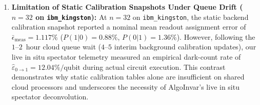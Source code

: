 \documentclass[aps,pra,reprint,superscriptaddress,floatfix,nofootinbib]{revtex4-2}
\begin{document}
\begin{enumerate}
    \item \textbf{Limitation of Static Calibration Snapshots Under Queue Drift ($n = 32$ on \texttt{ibm\_kingston}):} At $n = 32$ on \texttt{ibm\_kingston}, the static backend calibration snapshot reported a nominal mean readout assignment error of $\bar{\epsilon}_{\text{meas}} = 1.117\%$ ($P(1|0) = 0.88\%$, $P(0|1) = 1.36\%$). However, following the $1$--$2$~hour cloud queue wait ($4$--$5$ interim background calibration updates), our live in situ spectator telemetry measured an empirical dark-count rate of $\hat{\varepsilon}_{0\to 1} = 12.04\%/\text{qubit}$ during actual circuit execution. This contrast demonstrates why static calibration tables alone are insufficient on shared cloud processors and underscores the necessity of AlgoInvar's live in situ spectator deconvolution.
\end{enumerate}
\end{document}
